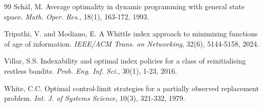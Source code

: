 \documentclass[letterpaper,10pt,conference]{ieeeconf}  %
\begin{document}
\begin{thebibliography}{99}
 Sch\"{a}l, M. Average optimality in dynamic programming with general state space. 
{\it Math. Oper. Res.}, 18(1), 163-172, 1993.

 Tripathi, V. and Modiano, E. A {W}hittle index approach to minimizing functions of age of information. {\it IEEE/ACM Trans. on Networking}, 32(6), 5144-5158, 2024.

 Villar, S.S. Indexability and optimal index policies for a class of reinitialising restless bandits. {\it Prob. Eng. Inf. Sci.}, 30(1), 1-23, 2016.

 White, C.C. Optimal control-limit strategies for a partially observed replacement problem. {\it Int. J. of Systems Science}, 10(3), 321-332, 1979.

\end{thebibliography}
\end{document}
